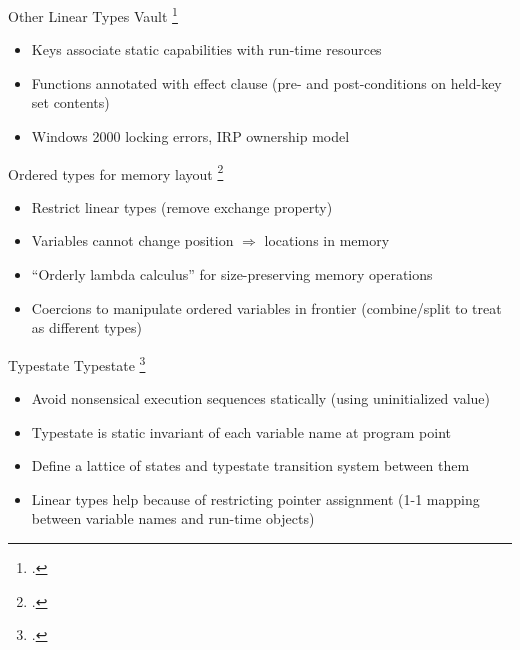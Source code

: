\documentclass[aspectratio=169]{beamer}
\begin{document}
\begin{frame}{Other Linear Types}
\footnotesize
  Vault \footcite{deline_enforcing_2001} %
    \vspace{-0.09in}
    \begin{itemize}
        \item Keys associate static capabilities with run-time resources %
        \item Functions annotated with effect clause (pre- and post-conditions on held-key set contents)
        \item Windows 2000 locking errors, IRP ownership model %
    \end{itemize}
  Ordered types for memory layout \footcite{petersen_type_2003}
    \vspace{-0.09in}
    \begin{itemize}
        \item Restrict linear types (remove exchange property)
        \item Variables cannot change position $\Rightarrow$ locations in memory
        \item ``Orderly lambda calculus'' for size-preserving memory operations
        \item Coercions to manipulate ordered variables in frontier (combine/split to treat as different types)
    \end{itemize}
  \vspace{0.1in}
\end{frame}

\begin{frame}{Typestate}
  Typestate \footcite{strom_typestate:_1986}
    \begin{itemize}
        \item Avoid nonsensical execution sequences statically (using uninitialized value)
        \item Typestate is static invariant of each variable name at program point %
        \item Define a lattice of states and typestate transition system between them
        \item Linear types help because of restricting pointer assignment (1-1 mapping between variable names and run-time objects)
    \end{itemize}
\end{frame}
\end{document}
